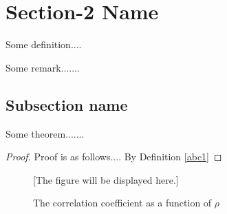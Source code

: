 \section{Section-2 Name}
\begin{definition}\label{abc2}
Some definition....
\end{definition}

\begin{remark}
Some remark.......
\end{remark}

\subsection{Subsection name}

\begin{theorem}
Some theorem.......
\end{theorem}

\begin{proof}
Proof is as follows.... By Definition \ref{abc1}
\end{proof}


\begin{figure}[h]

[The figure will be displayed here.]

\caption{The correlation coefficient as a function of $\rho$}
\end{figure}


